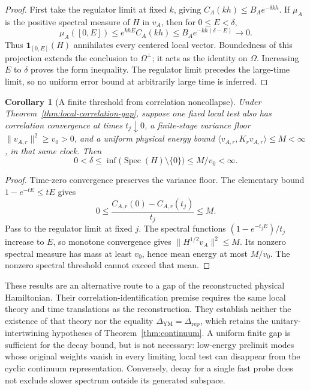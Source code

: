\documentclass[11pt]{article}
\numberwithin{equation}{section}
\newtheorem{corollary}[theorem]{Corollary}
\theoremstyle{remark}
\newcommand{\YM}{\mathrm{YM}}
\begin{document}
\begin{proof}
First take the regulator limit at fixed \(k\), giving
\(C_A(kh)\le B_Ae^{-\delta kh}\). If \(\mu_A\) is the positive spectral
measure of \(H\) in \(v_A\), then for \(0\le E<\delta\),
\[
\mu_A([0,E])\le e^{khE}C_A(kh)
\le B_Ae^{-kh(\delta-E)}\longrightarrow0.
\]
Thus \(\mathbf1_{[0,E]}(H)\) annihilates every centered local vector.
Boundedness of this projection extends the conclusion to
\(\Omega^\perp\); it acts as the identity on \(\Omega\). Increasing \(E\)
to \(\delta\) proves the form inequality. The regulator limit precedes
the large-time limit, so no uniform error bound at arbitrarily large time
is inferred.
\end{proof}

\begin{corollary}[A finite threshold from correlation noncollapse]
\label{cor:local-correlation-noncollapse}
Under Theorem~\ref{thm:local-correlation-gap}, suppose one fixed local test
also has correlation convergence at times \(t_j\downarrow0\), a finite-stage
variance floor \(\|v_{A,r}\|^2\ge v_0>0\), and a uniform physical energy bound
\(\langle v_{A,r},K_rv_{A,r}\rangle\le M<\infty\), in that same clock. Then
\[
0<\delta\le\inf\bigl(\operatorname{Spec}(H)\setminus\{0\}\bigr)
\le M/v_0<\infty.
\]
\end{corollary}

\begin{proof}
Time-zero convergence preserves the variance floor. The elementary bound
\(1-e^{-tE}\le tE\) gives
\[
0\le\frac{C_{A,r}(0)-C_{A,r}(t_j)}{t_j}\le M.
\]
Pass to the regulator limit at fixed \(j\). The spectral functions
\((1-e^{-t_jE})/t_j\) increase to \(E\), so monotone convergence gives
\(\|H^{1/2}v_A\|^2\le M\). Its nonzero spectral measure has mass at least
\(v_0\), hence mean energy at most \(M/v_0\). The nonzero spectral threshold
cannot exceed that mean.
\end{proof}

These results are an alternative route to a gap of the reconstructed physical
Hamiltonian. Their correlation-identification premise requires the same
local theory and time translations as the reconstruction. They establish
neither the existence of that theory nor the equality
\(\Delta_{\YM}=\Delta_{\mathrm{rep}}\), which retains the unitary-intertwining
hypotheses of Theorem~\ref{thm:continuum}. A uniform finite gap is sufficient
for the decay bound, but is not necessary: low-energy prelimit modes whose
original weights vanish in every limiting local test can disappear from the
cyclic continuum representation. Conversely, decay for a single fast probe
does not exclude slower spectrum outside its generated subspace.
\end{document}
